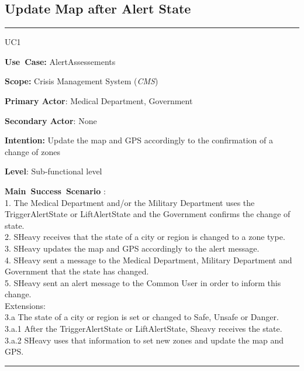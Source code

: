 \subsection{Update Map after Alert State}
\vspace{0.5cm}
\hrule
\vspace{0.5cm}
\begin{lyxlist}{UC1}
\small{
\item [\textbf{Use~Case:}] AlertAssessements
\item [\textbf{Scope:}] Crisis Management System (\emph{CMS})
\item [\textbf{Primary Actor}:] Medical Department, Government
\item [\textbf{Secondary Actor}:] None
\item [\textbf{Intention:}] Update the map and GPS accordingly to 
the confirmation of a change of zones\\
\item [\textbf{Level}:]Sub-functional level
\item [\textbf{Main~Success~Scenario}]:\\
1.	The Medical Department and/or the Military Department uses the TriggerAlertState
 or LiftAlertState and the Government confirms the change of state.\\
2.	SHeavy receives that the state of a city or region is changed to a zone
type.\\
3.	SHeavy updates the map and GPS accordingly to the alert message.\\
4.	SHeavy sent a message to the Medical Department, Military Department and Government 
that the state has changed.\\
5.	SHeavy sent an alert message to the Common User in order to inform this
change.\\
Extensions:\\
	3.a The state of a city or region is set or changed to Safe, Unsafe or
	Danger.\\
		3.a.1 After the TriggerAlertState or LiftAlertState, Sheavy receives the
		state.\\
		3.a.2 SHeavy uses that information to set new zones and update the map and
		GPS.\\
}
\end{lyxlist}
\hrule
\vspace{0.5cm} 

